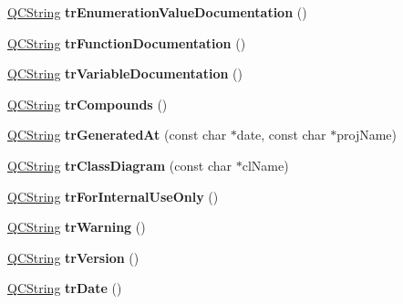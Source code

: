 \begin{DoxyCompactItemize}
\mbox{\hyperlink{class_q_c_string}{Q\+C\+String}} {\bfseries tr\+Enumeration\+Value\+Documentation} ()
\item 
\mbox{\label{class_translator_dutch_af946e994702e909d2d93ff4f298b1016}} 
\mbox{\hyperlink{class_q_c_string}{Q\+C\+String}} {\bfseries tr\+Function\+Documentation} ()
\item 
\mbox{\label{class_translator_dutch_a1f0c2e1bfb07ca8b9f05b106b3708ccc}} 
\mbox{\hyperlink{class_q_c_string}{Q\+C\+String}} {\bfseries tr\+Variable\+Documentation} ()
\item 
\mbox{\label{class_translator_dutch_a64b1c7cbe25d5f4ac81d248ef209cdc0}} 
\mbox{\hyperlink{class_q_c_string}{Q\+C\+String}} {\bfseries tr\+Compounds} ()
\item 
\mbox{\label{class_translator_dutch_a71fda8e35bca2a00703be5572accb969}} 
\mbox{\hyperlink{class_q_c_string}{Q\+C\+String}} {\bfseries tr\+Generated\+At} (const char $\ast$date, const char $\ast$proj\+Name)
\item 
\mbox{\label{class_translator_dutch_a41a24a7286dc8a70a3372d8dc48d84c0}} 
\mbox{\hyperlink{class_q_c_string}{Q\+C\+String}} {\bfseries tr\+Class\+Diagram} (const char $\ast$cl\+Name)
\item 
\mbox{\label{class_translator_dutch_ad607e64516709a16f8cd99db36ff13cd}} 
\mbox{\hyperlink{class_q_c_string}{Q\+C\+String}} {\bfseries tr\+For\+Internal\+Use\+Only} ()
\item 
\mbox{\label{class_translator_dutch_a0f0e242d6738d0eb779aa55eeab133f0}} 
\mbox{\hyperlink{class_q_c_string}{Q\+C\+String}} {\bfseries tr\+Warning} ()
\item 
\mbox{\label{class_translator_dutch_a4f6843a0a3c8510867025aaf98a936c7}} 
\mbox{\hyperlink{class_q_c_string}{Q\+C\+String}} {\bfseries tr\+Version} ()
\item 
\mbox{\label{class_translator_dutch_ae6c0d2663dd28a303296b997a09e026a}} 
\mbox{\hyperlink{class_q_c_string}{Q\+C\+String}} {\bfseries tr\+Date} ()

\end{DoxyCompactItemize}

